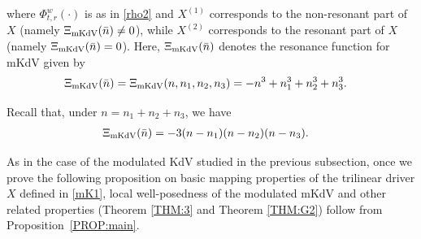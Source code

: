 \documentclass[letterpaper, 11pt,  reqno]{amsart}
\newcommand{\1}{\hspace{0.5mm}\text{I}\hspace{0.5mm}}
\newcommand{\noi}{\noindent}
\newcommand{\MKDV}{\text{\rm mKdV} }
\numberwithin{equation}{section}
\numberwithin{theorem}{section}
\begin{document}
\noi

\noi
where $ \Phi^w_{t,r} (\cdot)$ is as in \eqref{rho2} and 
  $X^{(1)}$ corresponds to the non-resonant part of $X$ (namely 
$\Xi_\MKDV (\bar n) \ne 0$), while 
 $X^{(2)}$ corresponds to the resonant part of $X$ (namely 
$\Xi_\MKDV (\bar n) = 0$).
Here, $\Xi_\MKDV (\bar n)$ denotes the resonance function for mKdV given by 
\begin{align*}
\Xi_\MKDV (\bar n)
= \Xi_\MKDV (n,n_1,n_2, n_3) 
&= - n^3+ n_1^3 +n_2^3 + n_3^3.
\end{align*}

\noi
Recall that, under $n = n_1+ n_2+n_3$, we have
\begin{align}
\Xi_\MKDV (\bar n)
& = - 3 (n-n_1)(n-n_2)(n-n_3).
\label{mK3a}
\end{align}



As in the case of the modulated KdV studied in the previous subsection, 
once we prove the following proposition 
on basic mapping properties
of the trilinear driver $X$ defined in \eqref{mK1}, 
local well-posedness of the modulated mKdV 
and other related properties
(Theorem \ref{THM:3} and Theorem \ref{THM:G2}) follow
from  Proposition~\ref{PROP:main}.
\end{document}
